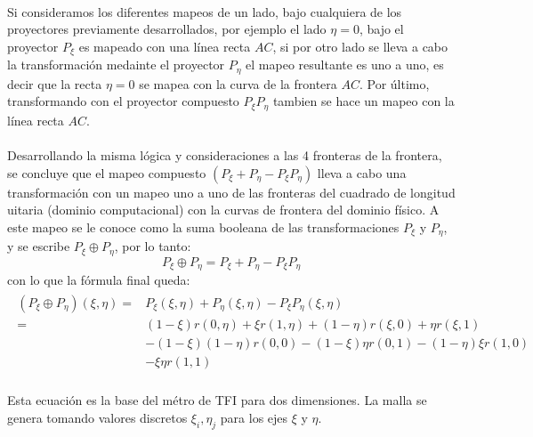 \documentclass[letterpaper, openright, 12pt]{book}
\begin{document}
			\paragraph*{}
				Si consideramos los diferentes mapeos de un lado, bajo cualquiera de los proyectores previamente desarrollados, por ejemplo el lado $\eta = 0$, bajo el proyector $P_{\xi}$ es mapeado con una línea recta $AC$, si por otro lado se lleva a cabo la transformación medainte el proyector $P_{\eta}$ el mapeo resultante es uno a uno, es decir que la recta $\eta = 0$ se mapea con la curva de la frontera $AC$. Por último, transformando con el proyector compuesto $P_{\xi}P_{\eta}$ tambien se hace un mapeo con la línea recta $AC$.
			\paragraph*{}
				Desarrollando la misma lógica y consideraciones a las 4 fronteras de la frontera, se concluye que el mapeo compuesto $(P_{\xi} + P_{\eta} - P_{\xi}P_{\eta})$ lleva a cabo una transformación con un mapeo uno  a uno de las fronteras del cuadrado de longitud uitaria (dominio computacional) con la curvas de frontera del dominio físico. A este mapeo se le conoce como la suma booleana de las transformaciones $P_{\xi}$ y $P_{\eta}$, y se escribe $P_{\xi}\oplus P_{\eta}$, por lo tanto:
				\begin{equation}
					P_{\xi}\oplus P_{\eta} = P_{\xi} + P_{\eta} - P_{\xi} P_{\eta}
				\end{equation}
				con lo que la fórmula final queda:
				\begin{align}
					\begin{aligned}
						\left( P_{\xi}\oplus P_{\eta} \right)(\xi, \eta) =& P_{\xi}(\xi, \eta) + P_{\eta}(\xi, \eta) - P_{\xi}P_{\eta}(\xi, \eta) \\
						=& (1 - \xi)r(0, \eta) + \xi r(1, \eta) + (1 - \eta)r(\xi, 0) + \eta r(\xi, 1) \\&- (1-\xi)(1 - \eta)r(0, 0) - (1 - \xi)\eta r(0, 1) - (1- \eta)\xi r(1, 0) \\& - \xi \eta r(1,1)
					\end{aligned}
				\end{align}
			\paragraph*{}
				Esta ecuación es la base del métro de TFI para dos dimensiones. La malla se genera tomando valores discretos $\xi_{i}, \eta_{j}$ para los ejes $\xi$ y $\eta$.
				
\end{document}
